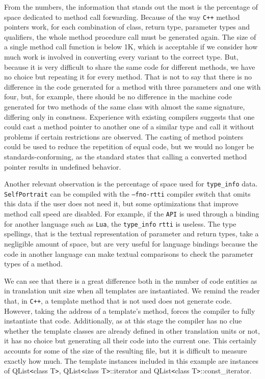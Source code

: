From the numbers, the information that stands out the most is the percentage of space dedicated to method call forwarding.
Because of the way \texttt{C++} method pointers work, for each combination of class, return type, parameter types and qualifiers, the
whole method procedure call must be generated again. The size of a single method call function is below 1K, which is acceptable
if we consider how much work is involved in converting every variant to the correct type. But, because it is very difficult
to share the same code for different methods, we have no choice but repeating it for every method. That is not to say that
there is no difference in the code generated for a method with three parameters and one with four, but, for example,
there should be no difference in the machine code generated for two methods of the same class with almost the same signature,
differing only in constness. Experience with existing compilers suggests that one could cast a method pointer to another 
one of a similar type \cite{Clugston} and call it without problems if certain restrictions are observed. The casting of method pointers could
be used to reduce the repetition of equal code, but we would no longer be standards-conforming, as the standard states that calling
a converted method pointer results in undefined behavior.

Another relevant observation is the percentage of space used for \texttt{type\_info} data. \texttt{SelfPortrait} can be compiled
with the \texttt{--fno-rtti} compiler switch that omits this data if the user does not need it, but some optimizations that improve
method call speed are disabled. For example, if the \texttt{API} is used through a binding for another language such as \texttt{Lua},
the \texttt{type\_info} \texttt{rtti} is useless. The type spellings, that is the textual representation of parameter and return types,
take a negligible amount of space, but are very useful for language bindings because the code in another language can make textual
comparisons to check the parameter types of a method.

We can see that there is a great difference both in the number of code entities as in translation unit size when all templates
are instantiated. We remind the reader that, in \texttt{C++}, a template method that is not used does not generate code. However, taking the
address of a template's method, forces the compiler to fully instantiate that code. Additionally, as at this stage the compiler has no clue
whether the template classes are already defined in other translation units or not, it has no choice but generating all their code
into the current one. This certainly accounts for some of the size of the resulting file, but it is difficult to measure exactly how much.
The template instances included in this example are instances of QList\verb|<|class T\verb|>|, QList\verb|<|class T\verb|>|::iterator and
QList\verb|<|class T\verb|>|::const\_iterator.

